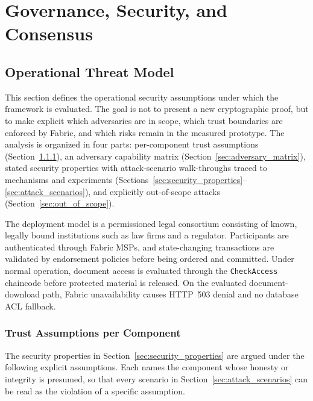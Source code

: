 \documentclass[preprint,12pt]{elsarticle}
\begin{document}
\section{Governance, Security, and Consensus}
\label{sec:governance_security}

\subsection{Operational Threat Model}
\label{sec:threat_model}

This section defines the operational security assumptions under which
the framework is evaluated. The goal is not to present a new
cryptographic proof, but to make explicit which adversaries are in
scope, which trust boundaries are enforced by Fabric, and which risks
remain in the measured prototype. The analysis is organized in four
parts: per-component trust assumptions
(Section~\ref{sec:trust_assumptions}), an adversary capability matrix
(Section~\ref{sec:adversary_matrix}), stated security properties with
attack-scenario walk-throughs traced to mechanisms and experiments
(Sections~\ref{sec:security_properties}--\ref{sec:attack_scenarios}),
and explicitly out-of-scope attacks
(Section~\ref{sec:out_of_scope}).

The deployment model is a permissioned legal consortium consisting of
known, legally bound institutions such as law firms and a regulator.
Participants are authenticated through Fabric MSPs, and state-changing
transactions are validated by endorsement policies before being
ordered and committed. Under normal operation, document access is
evaluated through the \texttt{CheckAccess} chaincode before protected
material is released. On the evaluated document-download path, Fabric
unavailability causes HTTP~503 denial and no database ACL fallback.

\subsubsection{Trust Assumptions per Component}
\label{sec:trust_assumptions}

The security properties in Section~\ref{sec:security_properties} are
argued under the following explicit assumptions. Each names the
component whose honesty or integrity is presumed, so that every
scenario in Section~\ref{sec:attack_scenarios} can be read as the
violation of a specific assumption.
\end{document}
